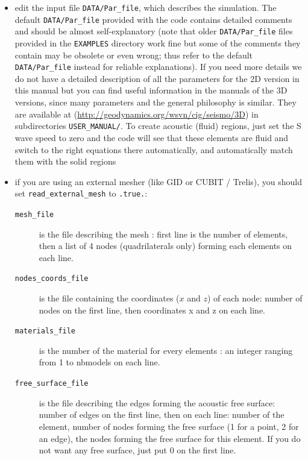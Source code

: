\documentclass[oneside,english,onecolumn,letterpaper]{book}
\newcommand{\urlwithparentheses}[1]{(\url{#1})}
\begin{document}
\begin{itemize}

\item edit the input file \texttt{DATA/Par\_file}, which describes the simulation.
The default \texttt{DATA/Par\_file} provided with the code contains detailed comments and should be almost self-explanatory
(note that older \texttt{DATA/Par\_file} files provided in the \texttt{EXAMPLES} directory work fine but some of the comments
they contain may be obsolete or even wrong; thus refer to the default \texttt{DATA/Par\_file} instead for reliable explanations).
If you need more details we do not have a detailed description of all the parameters for the 2D version in this manual
but you can find useful information in the manuals of the 3D versions, since many parameters and the general philosophy is similar. They are available at
\urlwithparentheses{http://geodynamics.org/wsvn/cig/seismo/3D} in subdirectories \texttt{USER\_MANUAL/}.
To create acoustic (fluid) regions, just set the S wave speed to zero and the code will see that these elements are fluid and switch to the right equations there automatically, and automatically match them with the solid regions

\item if you are using an external mesher (like GID or CUBIT / Trelis), you should set \texttt{read\_external\_mesh} to \texttt{.true.}:
	\begin{description}
     \item[\texttt{mesh\_file}] is the file describing the mesh : first line is the number of elements, then a list of 4 nodes (quadrilaterals only) forming each elements on each line.

     \item[\texttt{nodes\_coords\_file}] is the file containing the coordinates ($x$ and $z$) of each node: number of nodes on the first line, then coordinates x and z on each line.

     \item[\texttt{materials\_file}] is the number of the material for every elements : an integer ranging from 1 to nbmodels on each line.

     \item[\texttt{free\_surface\_file}] is the file describing the edges forming the acoustic free surface: number of edges on the first line, then on each line: number of the element, number of nodes forming the free surface (1 for a point, 2 for an edge), the nodes forming the free surface for this element. If you do not want any free surface, just put 0 on the first line.


\end{description}
\end{itemize}
\end{document}
